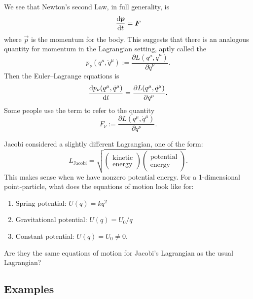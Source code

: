 We see that Newton's second Law, in full generality, is
\begin{equation}
\frac{\mathrm{d}\boldsymbol{p}}{\mathrm{d} t} =\boldsymbol{F}
\end{equation}
where $\vec{p}$ is the momentum for the body. This suggests that there
is an analogous quantity for momentum in the Lagrangian setting, aptly
called the 
\begin{equation}
p_{\nu}(q^{\mu},\dot{q}^{\mu}) := \frac{\partial L(q^{\mu},\dot{q}^{\mu})}{\partial\dot{q}^{\nu}}.
\end{equation}
Then the Euler--Lagrange equations is
\begin{equation}
\frac{\mathrm{d} p_{\nu}(q^{\mu},\dot{q}^{\mu})}{\mathrm{d} t} = \frac{\partial L(q^{\mu},\dot{q}^{\mu})}{\partial q^{\nu}}.
\end{equation}
Some people use the term  to refer to the
quantity
\begin{equation}
F_{\nu} := \frac{\partial L(q^{\mu},\dot{q}^{\mu})}{\partial q^{\nu}}.
\end{equation}

Jacobi considered a slightly different Lagrangian, one of the form:
\begin{equation}
L_{\text{Jacobi}} = \sqrt{\begin{pmatrix}\mbox{kinetic}\\\mbox{energy}\end{pmatrix}\begin{pmatrix}\mbox{potential}\\\mbox{energy}\end{pmatrix}}.
\end{equation}
This makes sense when we have nonzero potential energy. For a
1-dimensional point-particle, what does the equations of motion look
like for:
\begin{enumerate}
\item Spring potential: $U(q)=kq^{2}$
\item Gravitational potential: $U(q) = U_{0}/q$
\item Constant potential: $U(q)=U_{0}\neq0$.
\end{enumerate}
Are they the same equations of motion for Jacobi's Lagrangian as the
usual Lagrangian?

\subsection{Examples}

